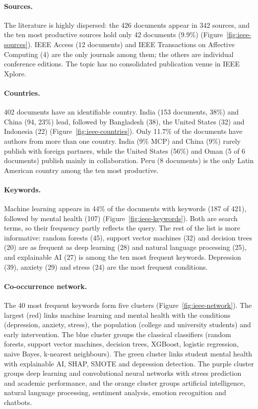 \documentclass[11pt,a4paper]{article}
\begin{document}
\paragraph{Sources.} The literature is highly dispersed: the 426 documents appear in 342 sources, and the ten most productive sources hold only 42 documents (9.9\%) (Figure~\ref{fig:ieee-sources}). IEEE Access (12 documents) and IEEE Transactions on Affective Computing (4) are the only journals among them; the others are individual conference editions. The topic has no consolidated publication venue in IEEE Xplore.

\paragraph{Countries.} 402 documents have an identifiable country. India (153 documents, 38\%) and China (94, 23\%) lead, followed by Bangladesh (38), the United States (32) and Indonesia (22) (Figure~\ref{fig:ieee-countries}). Only 11.7\% of the documents have authors from more than one country. India (9\% MCP) and China (9\%) rarely publish with foreign partners, while the United States (56\%) and Oman (5 of 6 documents) publish mainly in collaboration. Peru (8 documents) is the only Latin American country among the ten most productive.

\paragraph{Keywords.} Machine learning appears in 44\% of the documents with keywords (187 of 421), followed by mental health (107) (Figure~\ref{fig:ieee-keywords}). Both are search terms, so their frequency partly reflects the query. The rest of the list is more informative: random forests (45), support vector machines (32) and decision trees (20) are as frequent as deep learning (28) and natural language processing (25), and explainable AI (27) is among the ten most frequent keywords. Depression (39), anxiety (29) and stress (24) are the most frequent conditions.

\paragraph{Co-occurrence network.} The 40 most frequent keywords form five clusters (Figure~\ref{fig:ieee-network}). The largest (red) links machine learning and mental health with the conditions (depression, anxiety, stress), the population (college and university students) and early intervention. The blue cluster groups the classical classifiers (random forests, support vector machines, decision trees, XGBoost, logistic regression, naive Bayes, k-nearest neighbours). The green cluster links student mental health with explainable AI, SHAP, SMOTE and depression detection. The purple cluster groups deep learning and convolutional neural networks with stress prediction and academic performance, and the orange cluster groups artificial intelligence, natural language processing, sentiment analysis, emotion recognition and chatbots.
\end{document}
